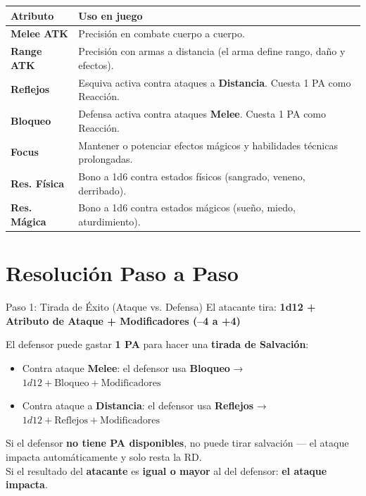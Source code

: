 \vspace{0.3cm}

\begin{center}
\begin{tabularx}{\linewidth}{|l|X|}
\hline
\rowcolor{HammerRed!15} \textbf{Atributo} & \textbf{Uso en juego} \\ \hline
\textbf{Melee ATK} & Precisión en combate cuerpo a cuerpo. \\ \hline
\textbf{Range ATK} & Precisión con armas a distancia (el arma define rango, daño y efectos). \\ \hline
\textbf{Reflejos} & Esquiva activa contra ataques a \textbf{Distancia}. Cuesta 1 PA como Reacción. \\ \hline
\textbf{Bloqueo} & Defensa activa contra ataques \textbf{Melee}. Cuesta 1 PA como Reacción. \\ \hline
\textbf{Focus} & Mantener o potenciar efectos mágicos y habilidades técnicas prolongadas. \\ \hline
\textbf{Res. Física} & Bono a 1d6 contra estados físicos (sangrado, veneno, derribado). \\ \hline
\textbf{Res. Mágica} & Bono a 1d6 contra estados mágicos (sueño, miedo, aturdimiento). \\ \hline
\end{tabularx}
\end{center}

\section{Resolución Paso a Paso}

\begin{reglaespecial}{Paso 1: Tirada de Éxito (Ataque vs. Defensa)}
El atacante tira: \textbf{1d12 + Atributo de Ataque + Modificadores (--4 a +4)}

El defensor puede gastar \textbf{1 PA} para hacer una \textbf{tirada de Salvación}:
\begin{itemize}
    \item Contra ataque \textbf{Melee}: el defensor usa \textbf{Bloqueo} → $1d12 + \text{Bloqueo} + \text{Modificadores}$
    \item Contra ataque a \textbf{Distancia}: el defensor usa \textbf{Reflejos} → $1d12 + \text{Reflejos} + \text{Modificadores}$
\end{itemize}

Si el defensor \textbf{no tiene PA disponibles}, no puede tirar salvación — el ataque impacta automáticamente y solo resta la RD.\\[4pt]
Si el resultado del \textbf{atacante} es \textbf{igual o mayor} al del defensor: \textbf{el ataque impacta}.
\end{reglaespecial}

